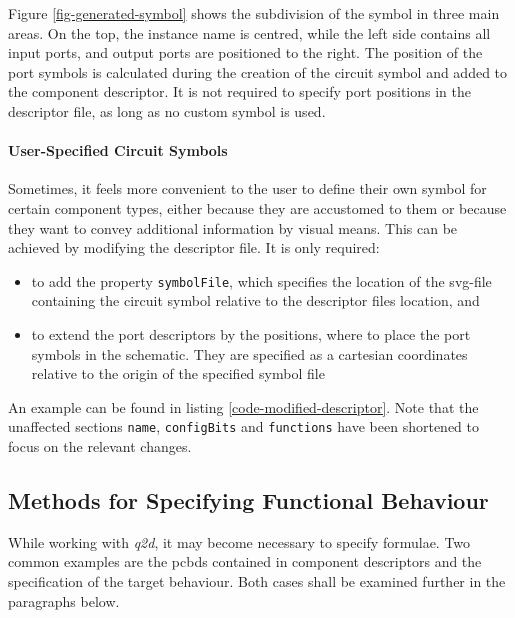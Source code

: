 	Figure \ref{fig-generated-symbol} shows the subdivision of the symbol in three main areas.
	On the top, the instance name is centred, while the left side contains all input ports, and output ports are positioned to the right.
	The position of the port symbols is calculated during the creation of the circuit symbol and added to the component descriptor.
	It is not required to specify port positions in the descriptor file, as long as no custom symbol is used.
	
	\paragraph{User-Specified Circuit Symbols}
	Sometimes, it feels more convenient to the user to define their own symbol for certain component types, either because they are accustomed to them or because they want to convey additional information by visual means.
	This can be achieved by modifying the descriptor file.
	It is only required:
	
	\begin{itemize}	
		\item to add the property \texttt{symbolFile}, which specifies the location of the \gls{svg}-file containing the circuit symbol relative to the descriptor files location, and
		
		\item to extend the port descriptors by the positions, where to place the port symbols in the schematic.
		They are specified as a cartesian coordinates relative to the origin of the specified symbol file
	\end{itemize}
	
	An example can be found in listing \ref{code-modified-descriptor}.
	Note that the unaffected sections \texttt{name}, \texttt{configBits} and \texttt{functions} have been shortened to focus on the relevant changes.
	
	
\subsection{Methods for Specifying Functional Behaviour}
	\label{sec-functional-behaviour-spec}
	
	While working with \emph{q2d}, it may become necessary to specify formulae.
	Two common examples are the \glspl{pcbd} contained in component descriptors and the specification of the target behaviour.
	Both cases shall be examined further in the paragraphs below.	
	
